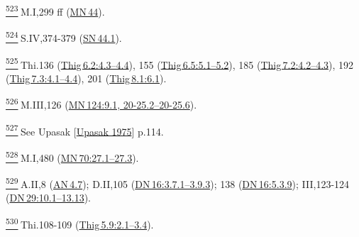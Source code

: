 \label{footprints_split_025.html_fn523}
\hyperref[footprints_split_014.htmlux5cux23fnref523]{\textsuperscript{523}} M.I,299
ff (\href{https://suttacentral.net/mn44/en/sujato}{MN\,44}).

\label{footprints_split_025.html_fn524}
\hyperref[footprints_split_014.htmlux5cux23fnref524]{\textsuperscript{524}} S.IV,374-379
(\href{https://suttacentral.net/sn44.1/en/sujato}{SN\,44.1}).

\label{footprints_split_025.html_fn525}
\hyperref[footprints_split_014.htmlux5cux23fnref525]{\textsuperscript{525}} Thi.136
(\href{https://suttacentral.net/thig6.2/en/sujato\#4.3}{Thig\,6.2:4.3--4.4}),
155
(\href{https://suttacentral.net/thig6.5/en/sujato\#5.1}{Thig\,6.5:5.1--5.2}),
185
(\href{https://suttacentral.net/thig7.2/en/sujato\#4.2}{Thig\,7.2:4.2--4.3}),
192
(\href{https://suttacentral.net/thig7.3/en/sujato\#4.1}{Thig\,7.3:4.1--4.4}),
201
(\href{https://suttacentral.net/thig8.1/en/sujato\#6.1}{Thig\,8.1:6.1}).

\label{footprints_split_025.html_fn526}
\hyperref[footprints_split_014.htmlux5cux23fnref526]{\textsuperscript{526}} M.III,126
(\href{https://suttacentral.net/mn124/en/sujato\#9.1}{MN\,124:9.1,
20-25.2--20-25.6}).

\label{footprints_split_025.html_fn527}
\hyperref[footprints_split_014.htmlux5cux23fnref527]{\textsuperscript{527}} See
{Upasak
{{[}\hyperref[footprints_split_022.htmlux5cux23Upasakux5cux25201975]{Upasak
1975}{]}}} p.114.

\label{footprints_split_025.html_fn528}
\hyperref[footprints_split_014.htmlux5cux23fnref528]{\textsuperscript{528}} M.I,480
(\href{https://suttacentral.net/mn70/en/sujato\#27.1}{MN\,70:27.1--27.3}).

\label{footprints_split_025.html_fn529}
\hyperref[footprints_split_014.htmlux5cux23fnref529]{\textsuperscript{529}} A.II,8
(\href{https://suttacentral.net/an4.7/en/sujato}{AN\,4.7}); D.II,105
(\href{https://suttacentral.net/dn16/en/sujato\#3.7.1}{DN\,16:3.7.1--3.9.3});
138
(\href{https://suttacentral.net/dn16/en/sujato\#5.3.9}{DN\,16:5.3.9});
III,123-124
(\href{https://suttacentral.net/dn29/en/sujato\#10.1}{DN\,29:10.1--13.13}).

\label{footprints_split_025.html_fn530}
\hyperref[footprints_split_014.htmlux5cux23fnref530]{\textsuperscript{530}} Thi.108-109
(\href{https://suttacentral.net/thig5.9/en/sujato\#2.1}{Thig\,5.9:2.1--3.4}).

